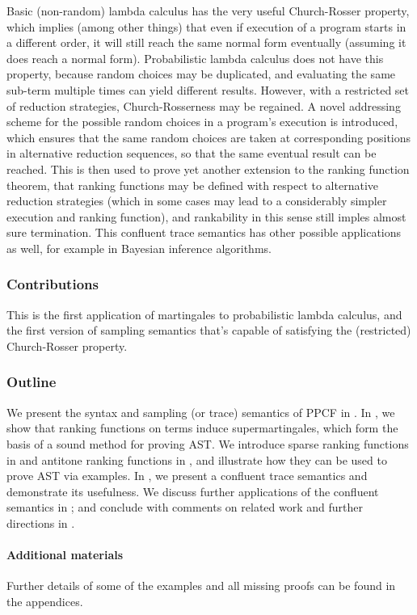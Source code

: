 Basic (non-random) lambda calculus has the very useful Church-Rosser property, which implies (among other things) that even if execution of a program starts in a different order, it will still reach the same normal form eventually (assuming it does reach a normal form). Probabilistic lambda calculus does not have this property, because random choices may be duplicated, and evaluating the same sub-term multiple times can yield different results. However, with a restricted set of reduction strategies, Church-Rosserness may be regained. A novel addressing scheme for the possible random choices in a program's execution is introduced, which ensures that the same random choices are taken at corresponding positions in alternative reduction sequences, so that the same eventual result can be reached. This is then used to prove yet another extension to the ranking function theorem, that ranking functions may be defined with respect to alternative reduction strategies (which in some cases may lead to a considerably simpler execution and ranking function), and rankability in this sense still imples almost sure termination. This confluent trace semantics has other possible applications as well, for example in Bayesian inference algorithms.

\subsubsection*{Contributions}

This is the first application of martingales to probabilistic lambda calculus, and the first version of sampling semantics that's capable of satisfying the (restricted) Church-Rosser property.


\subsubsection*{Outline}

We present the syntax and sampling (or trace) semantics of PPCF in .
In , we show that ranking functions on terms induce supermartingales, which form the basis of a sound method for proving AST.
We introduce sparse ranking functions in  and antitone ranking functions in , and illustrate how they can be used to prove AST via examples. 
In , we present a confluent trace semantics and demonstrate its usefulness.
We discuss further applications of the confluent semantics in ; and conclude with comments on related work and further directions in .

\paragraph*{Additional materials} Further details of some of the examples and all missing proofs can be found in the appendices.